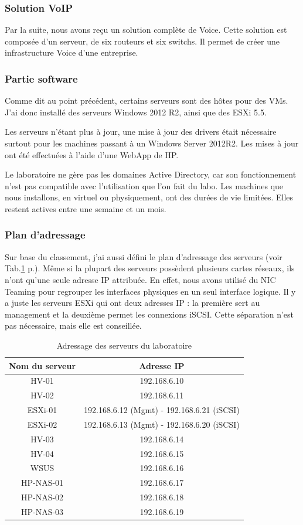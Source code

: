 \subsubsection{Solution VoIP}
Par la suite, nous avons reçu un solution complète de Voice.
Cette solution est composée d'un serveur, de six routeurs et six switchs.
Il permet de créer une infrastructure Voice d'une entreprise.

\subsubsection{Partie software}
Comme dit au point précédent, certains serveurs sont des hôtes pour des VMs.
J'ai donc installé des serveurs Windows 2012 R2, ainsi que des ESXi 5.5.

Les serveurs n'étant plus à jour, une mise à jour des drivers était nécessaire surtout pour les machines passant à un Windows Server 2012R2.
Les mises à jour ont été effectuées à l'aide d'une WebApp de HP.

Le laboratoire ne gère pas les domaines Active Directory, car son fonctionnement n'est pas compatible avec l'utilisation que l'on fait du labo. 
Les machines que nous installons, en virtuel ou physiquement, ont des durées de vie limitées.
Elles restent actives entre une semaine et un mois.

\subsubsection{Plan d'adressage}
Sur base du classement, j'ai aussi défini le plan d'adressage des serveurs (voir Tab.\ref{tab:addIP} p.\pageref{tab:addIP}).
Même si la plupart des serveurs possèdent plusieurs cartes réseaux, ils n'ont qu'une seule adresse IP attribuée.
En effet, nous avons utilisé du NIC Teaming pour regrouper les interfaces physiques en un seul interface logique.
Il y a juste les serveurs ESXi qui ont deux adresses IP : la première sert au management et la deuxième permet les connexions iSCSI.
Cette séparation n'est pas nécessaire, mais elle est conseillée.
\begin{table}
\centering
\begin{tabular}{cc}
\toprule
Nom du serveur & Adresse IP \\
\midrule
HV-01 & 192.168.6.10 \\ 
HV-02 & 192.168.6.11 \\ 
ESXi-01 & 192.168.6.12 (Mgmt) - 192.168.6.21 (iSCSI) \\ 
ESXi-02 & 192.168.6.13 (Mgmt) - 192.168.6.20 (iSCSI) \\ 
HV-03 & 192.168.6.14 \\ 
HV-04 & 192.168.6.15 \\ 
WSUS & 192.168.6.16 \\ 
HP-NAS-01 & 192.168.6.17 \\ 
HP-NAS-02 & 192.168.6.18 \\ 
HP-NAS-03 & 192.168.6.19 \\
\bottomrule
\end{tabular}
\caption{Adressage des serveurs du laboratoire}
\label{tab:addIP}
\end{table}

